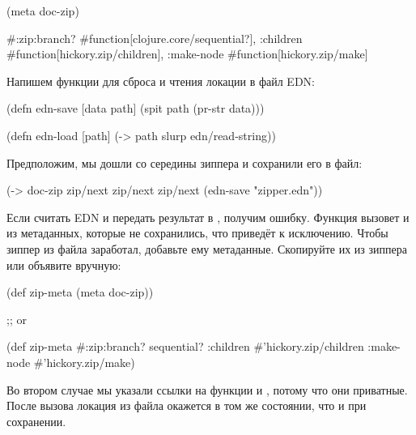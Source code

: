 
\begin{english}
  \begin{clojure}
(meta doc-zip)

#:zip{:branch? #function[clojure.core/sequential?],
      :children #function[hickory.zip/children],
      :make-node #function[hickory.zip/make]}
  \end{clojure}
\end{english}


Напишем функции для сброса и чтения локации в файл EDN:

\begin{english}
  \begin{clojure}
(defn edn-save [data path]
  (spit path (pr-str data)))

(defn edn-load [path]
  (-> path slurp edn/read-string))
  \end{clojure}
\end{english}

Предположим, мы дошли со середины зиппера и сохранили его в файл:

\begin{english}
  \begin{clojure}
(-> doc-zip
    zip/next
    zip/next
    zip/next
    (edn-save "zipper.edn"))
  \end{clojure}
\end{english}

Если считать EDN и передать результат в , получим ошибку. Функция
вызовет  и  из метаданных, которые не сохранились, что
приведёт к исключению. Чтобы зиппер из файла заработал, добавьте ему
метаданные. Скопируйте их из зиппера или объявите вручную:

\begin{english}
  \begin{clojure}
(def zip-meta
  (meta doc-zip))

;; or

(def zip-meta
  #:zip{:branch? sequential?
        :children #'hickory.zip/children
        :make-node #'hickory.zip/make})
  \end{clojure}
\end{english}

Во втором случае мы указали ссылки на функции  и
, потому что они приватные. После вызова 
 локация из файла окажется в том же состоянии, что и при сохранении.


